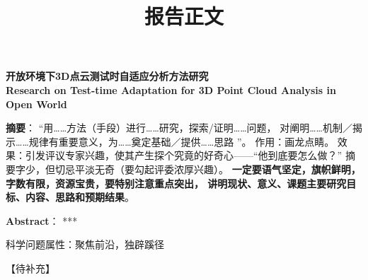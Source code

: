 \documentclass[12pt]{article}
\newcommand{\myEmph}[1]{\textbf{\textcolor[rgb]{0,0,0.25}{#1}}}
\begin{document}
\begin{center}\bf\Large 开放环境下3D点云测试时自适应分析方法研究 \\

Research on Test-time Adaptation for 3D Point Cloud Analysis in Open World 
\end{center}





\textbf{摘要}：
%
“用……方法（手段）进行……研究，探索/证明……问题，
对阐明……机制／揭示……规律有重要意义，为……奠定基础／提供……思路 ”。
作用：画龙点睛。
效果：引发评议专家兴趣，使其产生探个究竟的好奇心——“他到底要怎么做？”
摘要字少，但切忌平淡无奇（要勾起评委浓厚兴趣）。
\myEmph{一定要语气坚定，旗帜鲜明，字数有限，资源宝贵，要特别注意重点突出，
讲明现状、意义、课题主要研究目标、内容、思路和预期结果}。



\textbf{Abstract}：
***


科学问题属性：聚焦前沿，独辟蹊径



【待补充】


\clearpage


\title{报告正文}

\maketitle
\thispagestyle{empty}







\end{document}
